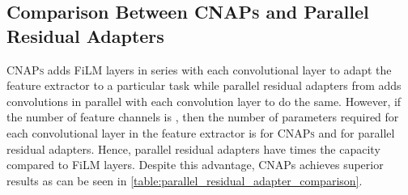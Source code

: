 \documentclass{article}
\theoremstyle{definition}
\newcommand{\cnaps}{\textsc{CNAPs}}
\begin{document}
\subsection{Comparison Between \cnaps{} and Parallel Residual Adapters \citep{rebuffi2018efficient}}
\label{app:parallel_residual_adapter_comparison}
 \cnaps{} adds FiLM layers \citep{perez2018film} in series with each convolutional layer to adapt the feature extractor to a particular task while parallel residual adapters from \citet{rebuffi2018efficient} adds  convolutions in parallel with each convolution layer to do the same. However, if the number of feature channels is , then the number of parameters required for each convolutional layer in the feature extractor is  for \cnaps{} and  for parallel residual adapters. Hence, parallel residual adapters have  times the capacity compared to FiLM layers. Despite this advantage, CNAPs achieves superior results as can be seen in \cref{table:parallel_residual_adapter_comparison}.
\end{document}
